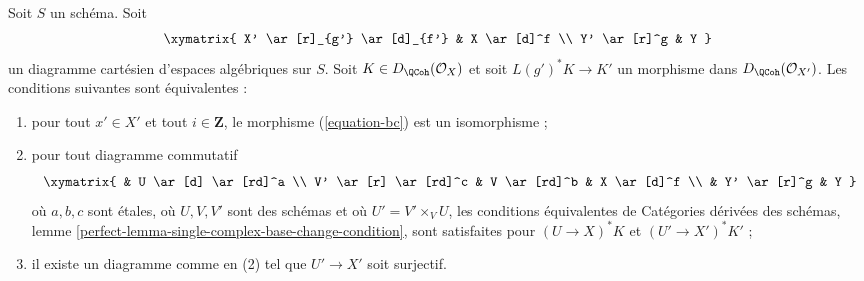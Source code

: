 \begin{lemma}
\label{lemma-single-complex-base-change-condition}
Soit $S$ un schéma. Soit
$$
\xymatrix{
X' \ar[r]_{g'} \ar[d]_{f'} &
X \ar[d]^f \\
Y' \ar[r]^g &
Y
}
$$
un diagramme cartésien d'espaces algébriques sur $S$.
Soit $K \in D_\QCoh(\mathcal{O}_X)$ et soit $L(g')^*K \to K'$
un morphisme dans $D_\QCoh(\mathcal{O}_{X'})$. Les conditions suivantes sont équivalentes :
\begin{enumerate}
\item pour tout $x' \in X'$ et tout $i \in \mathbf{Z}$, le morphisme (\ref{equation-bc})
est un isomorphisme ;
\item pour tout diagramme commutatif
$$
\xymatrix{
& U \ar[d] \ar[rd]^a \\
V' \ar[r] \ar[rd]^c & V \ar[rd]^b & X \ar[d]^f \\
& Y' \ar[r]^g & Y
}
$$
où $a, b, c$ sont étales, où $U, V, V'$ sont des schémas et où $U' = V' \times_V U$,
les conditions équivalentes de
Catégories dérivées des schémas, lemme
\ref{perfect-lemma-single-complex-base-change-condition},
sont satisfaites pour $(U \to X)^*K$ et $(U' \to X')^*K'$ ;
\item il existe un diagramme comme en (2) tel que $U' \to X'$ soit surjectif.
\end{enumerate}
\end{lemma}

